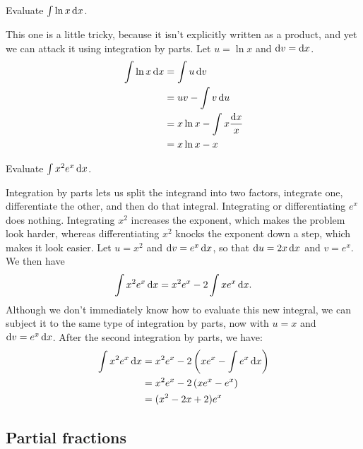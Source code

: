 \begin{eg}
\egquestion Evaluate $\int \ln x \operatorname{d\!} x$.

\eganswer This one is a little tricky, because it isn't explicitly
written as a product, and yet we can attack it using integration by
parts. Let $u=\ln x$ and $\operatorname{d\!} v=\operatorname{d\!} x$.
\begin{align*}
  \int \ln x \operatorname{d\!} x &= \int u \operatorname{d\!} v \\
                       &= uv - \int v \operatorname{d\!} u \\
                       &= x\ln x-\int x \frac{\operatorname{d\!} x}{x} \\
                       &= x\ln x-x
\end{align*}
\end{eg}

\begin{eg}\label{eg:integrate-x-squared-times-exp}
\egquestion Evaluate $\int x^2 e^x \operatorname{d\!} x$.

\eganswer
Integration by parts lets us split the integrand into two factors, integrate one, differentiate the
other, and then do that integral. Integrating or differentiating $e^x$ does nothing. Integrating
$x^2$ increases the exponent, which makes the problem look harder, whereas differentiating $x^2$
knocks the exponent down a step, which makes it look easier. Let $u=x^2$ and $\operatorname{d\!} v=e^x \operatorname{d\!} x$,
so that $\operatorname{d\!} u=2x\operatorname{d\!} x$ and $v=e^x$. We then have
\begin{equation*}
  \int x^2 e^x \operatorname{d\!} x = x^2 e^x - 2 \int x e^x\operatorname{d\!} x.
\end{equation*}
Although we don't immediately know how to evaluate this new integral, we can subject it to the
same type of integration by parts, now with $u=x$ and $\operatorname{d\!} v=e^x \operatorname{d\!} x$. After the second
integration by parts, we have:
\begin{align*}
  \int x^2 e^x \operatorname{d\!} x &= x^2 e^x - 2 \left(x e^x -\int e^x\operatorname{d\!} x \right) \\
                        &= x^2 e^x - 2 \left(x e^x - e^x \right) \\
                        &= (x^2-2x+2)e^x \\
\end{align*}
\end{eg}

\subsection{Partial fractions}

